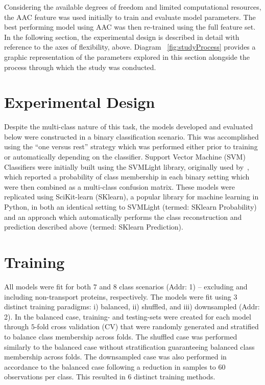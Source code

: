 Considering the available degrees of freedom and limited computational resources, the AAC feature was used initially
to train and evaluate model parameters. The best performing model using AAC was then re-trained using the full feature
set. In the following section, the experimental design is described in detail with reference to the axes of flexibility,
above. Diagram ~\ref{fig:studyProcess} provides a graphic representation of the parameters explored in this
section alongside the process through which the study was conducted.

\section{Experimental Design}
\label{sec:experimentaldesign}
Despite the multi-class nature of this task, the models developed and evaluated below were constructed in a binary
classification scenario. This was accomplished using the ``one versus rest'' strategy which was performed either prior
to training or automatically depending on the classifier. Support Vector Machine (SVM) Classifiers were initially built
using the SVMLight library, originally used by~\cite{mishra_prediction_2014}, which reported a probability of class
membership in each binary setting which were then combined as a multi-class confusion matrix. These models were
replicated using SciKit-learn (SKlearn), a popular library for machine learning in Python, in both an identical setting
to SVMLight (termed: SKlearn Probability) and an approach which automatically performs the class reconstruction and
prediction described above (termed: SKlearn Prediction). 

\section{Training}
All models were fit for both $7$ and $8$ class scenarios (Addr: 1) -- excluding and including non-transport proteins,
respectively. The models were fit using $3$ distinct training paradigms: i) balanced, ii) shuffled, and iii)
downsampled (Addr: 2). In the balanced case, training- and testing-sets were created for each model through $5$-fold
cross validation (CV) that were randomly generated and stratified to balance class membership across folds. The
shuffled case was performed similarly to the balanced case without stratification guaranteeing balanced class membership
across folds. The downsampled case was also performed in accordance to the balanced case following a reduction in
samples to $60$ observations per class. This resulted in $6$ distinct training methods.

